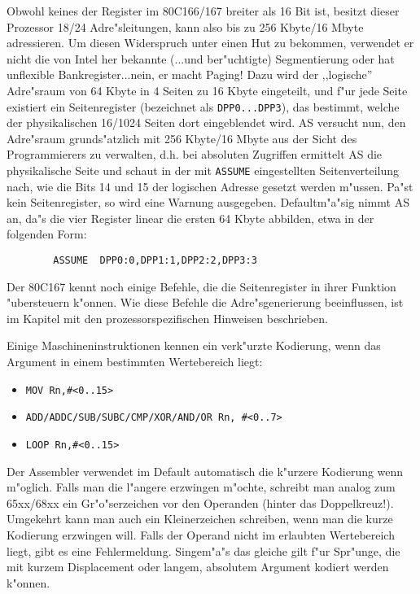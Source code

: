 \documentclass[12pt,a4paper,twoside]{report}
\newcommand{\tty}[1]{{\tt #1}}
\begin{document}
Obwohl keines der Register im 80C166/167 breiter als 16 Bit ist, besitzt
dieser Prozessor 18/24 Adre"sleitungen, kann also bis zu 256 Kbyte/16 Mbyte
adressieren.  Um diesen Widerspruch unter einen Hut zu bekommen, verwendet
er nicht die von Intel her bekannte (...und ber"uchtigte) Segmentierung oder
hat unflexible Bankregister...nein, er macht Paging!  Dazu wird der ,,logische''
Adre"sraum von 64 Kbyte in 4 Seiten zu 16 Kbyte eingeteilt, und f"ur jede
Seite existiert ein Seitenregister (bezeichnet als \tty{DPP0...DPP3}), das
bestimmt, welche der physikalischen 16/1024 Seiten dort eingeblendet wird.  AS versucht
nun, den Adre"sraum grunds"atzlich mit 256 Kbyte/16 Mbyte aus der Sicht des
Programmierers zu verwalten, d.h. bei absoluten Zugriffen ermittelt AS die
physikalische Seite und schaut in der mit \tty{ASSUME} eingestellten
Seitenverteilung nach, wie die Bits 14 und 15 der logischen Adresse gesetzt
werden m"ussen.  Pa"st kein Seitenregister, so wird eine Warnung ausgegeben.
Defaultm"a"sig nimmt AS an, da"s die vier Register linear die ersten 64 Kbyte
abbilden, etwa in der folgenden Form:
\begin{verbatim}
        ASSUME  DPP0:0,DPP1:1,DPP2:2,DPP3:3
\end{verbatim}
Der 80C167 kennt noch einige Befehle, die die Seitenregister in ihrer
Funktion "ubersteuern k"onnen.  Wie diese Befehle die Adre"sgenerierung
beeinflussen, ist im Kapitel mit den prozessorspezifischen Hinweisen
beschrieben.
\par
Einige Maschineninstruktionen kennen ein verk"urzte Kodierung, wenn das
Argument in einem bestimmten Wertebereich liegt:
\begin{itemize}
\item{\verb!MOV Rn,#<0..15>!}
\item{\verb!ADD/ADDC/SUB/SUBC/CMP/XOR/AND/OR Rn, #<0..7>!}
\item{\verb!LOOP Rn,#<0..15>!}
\end{itemize}
Der Assembler verwendet im Default automatisch die k"urzere Kodierung
wenn m"oglich.  Falls man die l"angere erzwingen m"ochte, schreibt
man analog zum 65xx/68xx ein Gr"o"serzeichen vor den Operanden (hinter
das Doppelkreuz!).  Umgekehrt kann man auch ein Kleinerzeichen schreiben,
wenn man die kurze Kodierung erzwingen will.  Falls der Operand nicht
im erlaubten Wertebereich liegt, gibt es eine Fehlermeldung.  Singem"a"s
das gleiche gilt f"ur Spr"unge, die mit kurzem Displacement oder langem,
absolutem Argument kodiert werden k"onnen.

\end{document}

